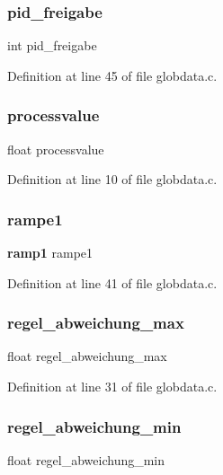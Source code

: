 \subsubsection{pid\+\_\+freigabe}
{\footnotesize\ttfamily int pid\+\_\+freigabe}



Definition at line 45 of file globdata.\+c.

\mbox{\label{globdata_8h_a94a90c1796eac371dd8d0c891eab98f4}} 
\subsubsection{processvalue}
{\footnotesize\ttfamily float processvalue}



Definition at line 10 of file globdata.\+c.

\mbox{\label{globdata_8h_adb61eaefb6edebc63458366696c69057}} 
\subsubsection{rampe1}
{\footnotesize\ttfamily \textbf{ ramp1} rampe1}



Definition at line 41 of file globdata.\+c.

\mbox{\label{globdata_8h_a6595b2c8f5c6c722273e82820d021a39}} 
\subsubsection{regel\+\_\+abweichung\+\_\+max}
{\footnotesize\ttfamily float regel\+\_\+abweichung\+\_\+max}



Definition at line 31 of file globdata.\+c.

\mbox{\label{globdata_8h_a83523ed56977e2d2ac0aeb57b58a5b80}} 
\subsubsection{regel\+\_\+abweichung\+\_\+min}
{\footnotesize\ttfamily float regel\+\_\+abweichung\+\_\+min}



